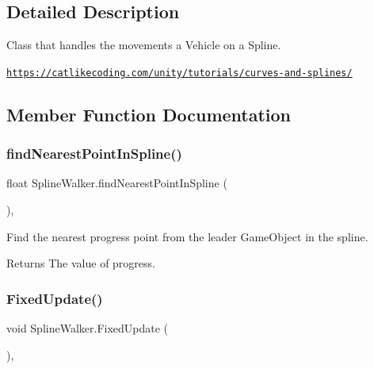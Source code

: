 \subsection{Detailed Description}
Class that handles the movements a Vehicle on a Spline. 

\href{https://catlikecoding.com/unity/tutorials/curves-and-splines/}{\tt https\+://catlikecoding.\+com/unity/tutorials/curves-\/and-\/splines/}

\subsection{Member Function Documentation}
\mbox{\label{classSplineWalker_a22d54e33aad18ea37775cea3229b7a72}} 
\subsubsection{\texorpdfstring{find\+Nearest\+Point\+In\+Spline()}{findNearestPointInSpline()}}
{\footnotesize\ttfamily float Spline\+Walker.\+find\+Nearest\+Point\+In\+Spline (\begin{DoxyParamCaption}{ }\end{DoxyParamCaption})\hspace{0.3cm}{\ttfamily [inline]}, {\ttfamily [private]}}



Find the nearest progress point from the leader Game\+Object in the spline. 

\begin{DoxyReturn}{Returns}
The value of progress.
\end{DoxyReturn}
\mbox{\label{classSplineWalker_a9f250a7d108edae41325147ff1716db1}} 
\subsubsection{\texorpdfstring{Fixed\+Update()}{FixedUpdate()}}
{\footnotesize\ttfamily void Spline\+Walker.\+Fixed\+Update (\begin{DoxyParamCaption}{ }\end{DoxyParamCaption})\hspace{0.3cm}{\ttfamily [inline]}, {\ttfamily [private]}}



